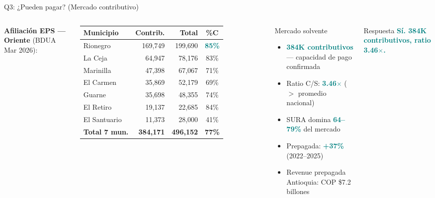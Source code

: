 \documentclass[aspectratio=169, 11pt]{beamer}
\newcommand{\highlight}[1]{\textcolor{teal}{\textbf{#1}}}
\newcommand{\src}[1]{\par\vspace{2pt}{\tiny\textcolor{slate}{Fuente: #1}}}
\begin{document}
\begin{frame}{Q3: ¿Pueden pagar? (Mercado contributivo)}
\begin{columns}[T]
{\small\textbf{Afiliación EPS --- Oriente} (BDUA Mar 2026):}

\vspace{4pt}
{\scriptsize
\begin{tabular}{@{}lrrc@{}}
\toprule
\textbf{Municipio} & \textbf{Contrib.} & \textbf{Total} & \textbf{\%C} \\
\midrule
\rowcolor{teal!8}
Rionegro & 169,749 & 199,690 & \highlight{85\%} \\
La Ceja & 64,947 & 78,176 & 83\% \\
Marinilla & 47,398 & 67,067 & 71\% \\
El Carmen & 35,869 & 52,179 & 69\% \\
Guarne & 35,698 & 48,355 & 74\% \\
El Retiro & 19,137 & 22,685 & 84\% \\
El Santuario & 11,373 & 28,000 & 41\% \\
\midrule
\rowcolor{teal!6}
\textbf{Total 7 mun.} & \textbf{384,171} & \textbf{496,152} & \textbf{77\%} \\
\bottomrule
\end{tabular}
}
\src{BDUA marzo 2026 (ADRES)}

\begin{exampleblock}{\small Mercado solvente}
\scriptsize
\begin{itemize}\setlength{\itemsep}{1pt}
  \item \highlight{384K contributivos} --- capacidad de pago confirmada
  \item Ratio C/S: \highlight{3.46$\times$} ($>$ promedio nacional)
  \item SURA domina \highlight{64--79\%} del mercado
  \item Prepagada: \highlight{+37\%} (2022--2025)
  \item Revenue prepagada Antioquia: COP \$7.2 billones
\end{itemize}
\end{exampleblock}

\vspace{2pt}
\begin{exampleblock}{\small Respuesta}
\centering\large
\highlight{Sí. 384K contributivos, ratio 3.46$\times$.}
\end{exampleblock}
\end{columns}
\end{frame}
\end{document}
